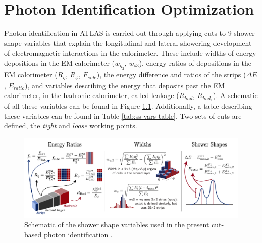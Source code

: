 \chapter{Photon Identification Optimization}

Photon identification in ATLAS is carried out through applying cuts to 9 shower shape variables that explain the longitudinal and lateral showering development of electromagnetic interactions in the calorimeter. These include widths of energy depositions in the \gls{EM} calorimeter ($w_{\eta_2}$, $w_{s3}$), energy ratios of depositions in the \gls{EM} calorimeter ($R_{\eta}$, $R_{\phi}$, $F_{side}$), the energy difference and ratios of the strips ($\Delta E$, $E_{ratio}$), and variables describing the energy that deposits past the \gls{EM} calorimeter, in the hadronic calorimeter, called leakage ($R_{had}$, $R_{had_1}$). A schematic of all these variables can be found in Figure \ref{fig:ss-vars-schematic}. Additionally, a table describing these variables can be found in Table \ref{tab:ss-vars-table}. Two sets of cuts are defined, the \textit{tight} and \textit{loose} working points. 

\begin{figure}
    \centering
    \includegraphics[width=.98\textwidth]{chapters/chapter4_photonID/images/ss-vars.png}
    \caption[Schematic of the shower shape variables used in the present cut-based photon identification.]
    {Schematic of the shower shape variables used in the present cut-based photon identification \cite{ss-var-schematic}.}
    \label{fig:ss-vars-schematic}
\end{figure}

